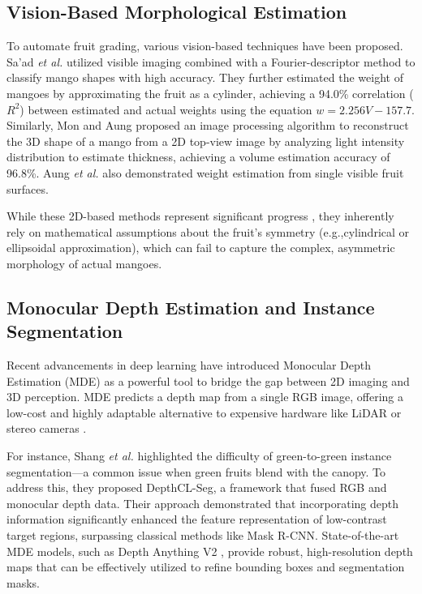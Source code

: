 \subsection{Vision-Based Morphological Estimation}
To automate fruit grading, various vision-based techniques have been proposed. 
Sa'ad \textit{et al.} \cite{shape2015mango} utilized visible imaging combined
with a Fourier-descriptor method to classify mango shapes with high accuracy. 
They further estimated the weight of mangoes by approximating the fruit as a
cylinder, achieving a 94.0\% correlation ($R^2$) between estimated and actual
weights using the equation $w = 2.256V - 157.7$. Similarly, Mon and Aung
\cite{volume2020mango} proposed an image processing algorithm to reconstruct the
3D shape of a mango from a 2D top-view image by analyzing light intensity
distribution to estimate thickness, achieving a volume estimation accuracy of
96.8\%. Aung \textit{et al.} \cite{japan2020mango} also demonstrated weight
estimation from single visible fruit surfaces.

While these 2D-based methods represent significant progress \cite{sweetpotato2022},
they inherently rely on mathematical assumptions about the fruit's symmetry (e.g.,cylindrical or ellipsoidal approximation), which can fail to capture the complex,
asymmetric morphology of actual mangoes.

\subsection{Monocular Depth Estimation and Instance Segmentation}
Recent advancements in deep learning have introduced Monocular Depth Estimation
(MDE) as a powerful tool to bridge the gap between 2D imaging and 3D perception.
MDE predicts a depth map from a single RGB image, offering a low-cost and highly
adaptable alternative to expensive hardware like LiDAR or stereo cameras
\cite{depthanythingv2}. 

For instance, Shang \textit{et al.} \cite{depthcl} highlighted the difficulty
of green-to-green instance segmentation---a common issue when green fruits blend
with the canopy. To address this, they proposed DepthCL-Seg, a framework that
fused RGB and monocular depth data. Their approach demonstrated that
incorporating depth information significantly enhanced the feature representation
of low-contrast target regions, surpassing classical methods like Mask R-CNN.
State-of-the-art MDE models, such as Depth Anything V2 \cite{depth_anything_v2},
provide robust, high-resolution depth maps that can be effectively utilized to
refine bounding boxes and segmentation masks.

